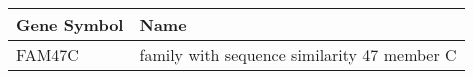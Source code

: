 \begin{tabular}{ll}
\toprule
Gene Symbol &                                        Name \\
\midrule
     FAM47C & family with sequence similarity 47 member C \\
\bottomrule
\end{tabular}
